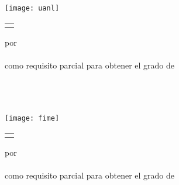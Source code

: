 \thispagestyle{empty}

\begin{scshape}
\begin{center}
	{\Large \uanl} \\[5mm]
	{\large \fime} \\[5mm]
	{\large \depg}
	\vskip15mm
	\texttt{[image: uanl]}
	\vskip12mm
	\begin{tabular}{p{12cm}}
		\centering
		{\large \titulo}
	\end{tabular}
	\vskip7mm
	{por}\\[7mm]
	{\large \autor}\\[7mm]
	{como requisito parcial para obtener el grado de}\\[3mm]
	\MakeUppercase{\grado}\\
	\orientacion
	\vfill
	\fecha
\end{center}
\end{scshape}
 
\newpage
\thispagestyle{empty}

\begin{scshape}
\begin{center}
	{\Large\uanl} \\[5mm]
	{\large\fime} \\[5mm]
	{\large\depg}
	\vskip16mm
	\texttt{[image: fime]}
	\vskip16mm
	\begin{tabular}{p{12cm}}
		\centering
		{\large \titulo}
	\end{tabular}
	\vskip7mm
	{por}\\[7mm]
	{\large \autor}\\[7mm]
	{como requisito parcial para obtener el grado de}\\[3mm]
	\MakeUppercase{\grado}\\
	\orientacion
	\vfill
	\fecha
\end{center}
\end{scshape}

\newpage
\thispagestyle{empty}
\enlargethispage{5mm}

